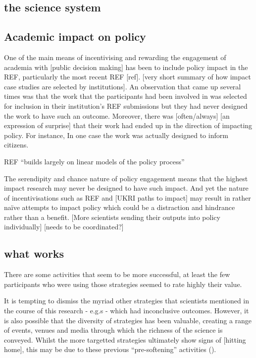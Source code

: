 \subsection{the science system}

\subsection{Academic impact on policy}
One of the main means of incentivising and rewarding the engagement of academia with [public decision making] has been to include policy impact in the REF, particularly the most recent REF [ref]. [very short summary of how impact case studies are selected by institutions]. An observation that came up several times was that the work that the participants had been involved in was selected for inclusion in their institution's REF submissions but they had never designed the work to have such an outcome. Moreover, there was [often/always] [an expression of surprise] that their work had ended up in the direction of impacting policy. For instance, In one case the work was actually designed to inform citizens. 

REF ``builds largely on linear models of the policy process'' \cite{CairneyO2020}

The serendipity and chance nature of policy engagement means that the highest impact research may never be designed to have such impact. And yet the nature of incentivisations such as REF and [UKRI paths to impact] may result in rather na\"ive attempts to impact policy which could be a distraction and hindrance rather than a benefit. [More scientists sending their outputs into policy individually] [needs to be coordinated?]

\subsection{what works}
There are some activities that seem to be more successful, at least the few participants who were using those strategies seemed to rate highly their value. 

It is tempting to dismiss the myriad other strategies that scientists mentioned in the course of this research - e.g.s - which had inconclusive outcomes. However, it is also possible that the diversity of strategies has been valuable, creating a range of events, venues and media through which the richness of the science is conveyed. Whilst the more targetted strategies ultimately show signs of [hitting home], this may be due to these previous ``pre-softening'' activities (\cite{Cairney2018}).

